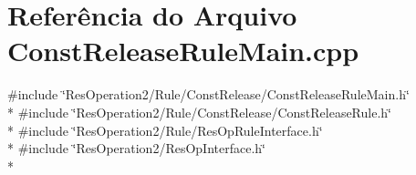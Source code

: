 \section{Referência do Arquivo Const\+Release\+Rule\+Main.\+cpp}
\label{_2_rule_2_const_release_2_const_release_rule_main_8cpp}
{\ttfamily \#include \char`\"{}Res\+Operation2/\+Rule/\+Const\+Release/\+Const\+Release\+Rule\+Main.\+h\char`\"{}}\\*
{\ttfamily \#include \char`\"{}Res\+Operation2/\+Rule/\+Const\+Release/\+Const\+Release\+Rule.\+h\char`\"{}}\\*
{\ttfamily \#include \char`\"{}Res\+Operation2/\+Rule/\+Res\+Op\+Rule\+Interface.\+h\char`\"{}}\\*
{\ttfamily \#include \char`\"{}Res\+Operation2/\+Res\+Op\+Interface.\+h\char`\"{}}\\*

